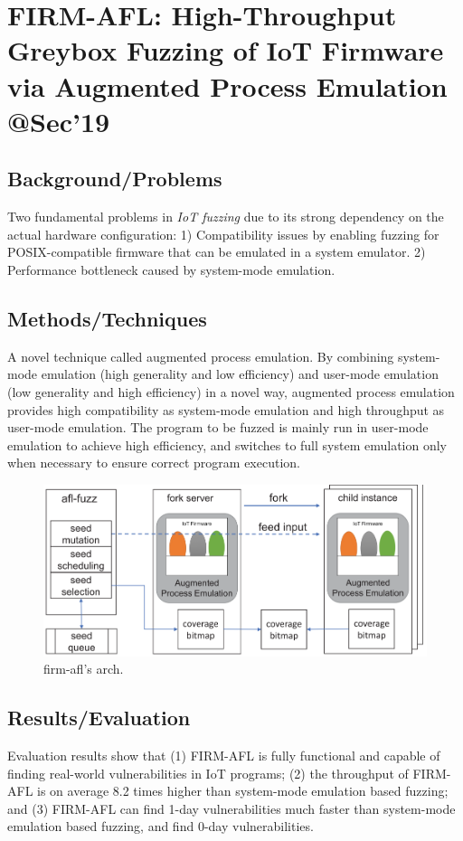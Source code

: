 \section{FIRM-AFL: High-Throughput Greybox Fuzzing of IoT Firmware via Augmented Process Emulation \\@Sec'19}
\subsection{Background/Problems}
Two fundamental problems in \emph{IoT fuzzing} due to its strong dependency on the actual hardware configuration: 1) Compatibility issues by enabling fuzzing for POSIX-compatible firmware that can be emulated in a system emulator. 2) Performance bottleneck caused by system-mode emulation. 
\subsection{Methods/Techniques}
A novel technique called augmented process emulation. By combining system-mode emulation  (high generality and low efficiency)  and user-mode emulation  (low generality and high efficiency) in a novel way, augmented process emulation provides high compatibility as system-mode emulation and high throughput as user-mode emulation.  The program to be fuzzed is mainly run in user-mode emulation to achieve high efficiency, and switches to full system emulation only when necessary to ensure correct program execution. 
\begin{figure}[h]
    \centering
    \includegraphics[width=0.9\linewidth]{firm-afl.png} %
    \caption{firm-afl's arch.}	
    \label{fig:firmafl}
\end{figure}
\subsection{Results/Evaluation}
Evaluation results show that (1) FIRM-AFL is fully functional and capable of finding real-world vulnerabilities in IoT programs; (2) the throughput of FIRM-AFL is on average 8.2 times higher than system-mode emulation based fuzzing; and (3) FIRM-AFL can find 1-day vulnerabilities much faster than system-mode emulation based fuzzing, and find 0-day vulnerabilities.

